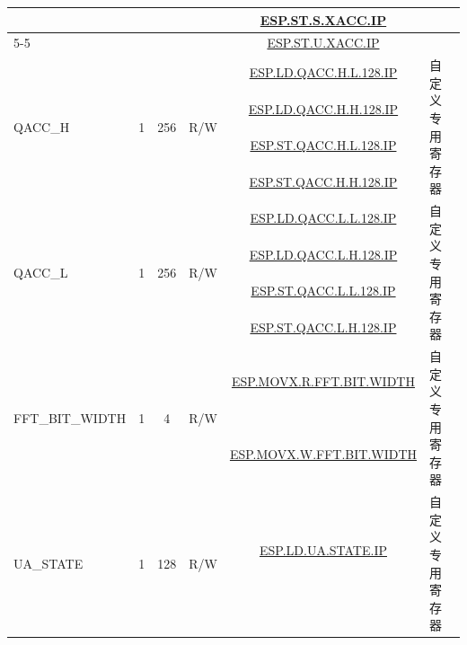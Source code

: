 \begin{ThreePartTable}
\begin{longtable}[c]{|l|c|c|c|c|l|}
& & & &  \hyperref[instruction:ESPSTSXACCIP]{ESP.ST.S.XACC.IP} & \\\cline{5-5}

& & & &  \hyperref[instruction:ESPSTUXACCIP]{ESP.ST.U.XACC.IP} & \\\hline

    \multirow{4}{*}{QACC\_H} & \multirow{4}{*}{1} & \multirow{4}{*}{256} & \multirow{4}{*}{R/W} & \hyperref[instruction:ESPLDQACC_HL128IP]{ESP.LD.QACC.H.L.128.IP}  & \multirow{4}{*}{自定义专用寄存器} \\\cline{5-5}

& & & &  \hyperref[instruction:ESPLDQACC_HH128IP]{ESP.LD.QACC.H.H.128.IP} & \\\cline{5-5}

& & & &  \hyperref[instruction:ESPSTQACC_HL128IP]{ESP.ST.QACC.H.L.128.IP} & \\\cline{5-5}

& & & &  \hyperref[instruction:ESPSTQACC_HH128IP]{ESP.ST.QACC.H.H.128.IP} & \\\hline


    \multirow{4}{*}{QACC\_L} & \multirow{4}{*}{1} & \multirow{4}{*}{256} & \multirow{4}{*}{R/W} & \hyperref[instruction:ESPLDQACC_LL128IP]{ESP.LD.QACC.L.L.128.IP} & \multirow{4}{*}{自定义专用寄存器} \\\cline{5-5}

& & & &  \hyperref[instruction:ESPLDQACC_LH128IP]{ESP.LD.QACC.L.H.128.IP} & \\\cline{5-5}

& & & &  \hyperref[instruction:ESPSTQACC_LL128IP]{ESP.ST.QACC.L.L.128.IP} & \\\cline{5-5}

& & & &  \hyperref[instruction:ESPSTQACC_LH128IP]{ESP.ST.QACC.L.H.128.IP} & \\\hline

    \multirow{2}{*}{FFT\_BIT\_WIDTH} & \multirow{2}{*}{1} & \multirow{2}{*}{4} & \multirow{2}{*}{R/W} & \hyperref[instruction:ESPMOVXRFFT_BIT_WIDTH]{ESP.MOVX.R.FFT.BIT.WIDTH} & \multirow{2}{*}{自定义专用寄存器} \\\cline{5-5}

   & & & &  \hyperref[instruction:ESPMOVXWFFT_BIT_WIDTH]{ESP.MOVX.W.FFT.BIT.WIDTH} & \\\hline

    \multirow{2}{*}{UA\_STATE} & \multirow{2}{*}{1} & \multirow{2}{*}{128} & \multirow{2}{*}{R/W} & \hyperref[instruction:ESPLDUA_STATEIP]{ESP.LD.UA.STATE.IP} &\multirow{2}{*}{自定义专用寄存器} \\\cline{5-5}


\end{longtable}
\end{ThreePartTable}
